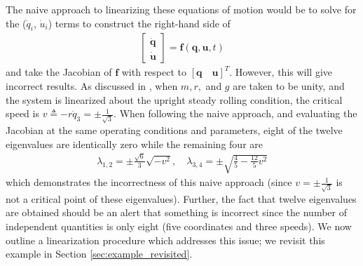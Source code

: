 \documentclass[smallcondensed,final]{svjour3}                     %
\begin{document}
The naive approach to linearizing these equations of motion would be to solve
for the ($\dot{q}_i$, $\dot{u}_i$) terms to construct the right-hand side of
\begin{align}
\begin{bmatrix}\dot{\mathbf{q}} \\ \dot{\mathbf{u}}\end{bmatrix} =
    \mathbf{f}(\mathbf{q}, \mathbf{u}, t)
\end{align}
and take the Jacobian of $\mathbf{f}$ with respect to $[\mathbf{q} \quad
\mathbf{u}]^T$. However, this will give incorrect results. As discussed in
\cite{Schwab2003}, when $m, r,$ and $g$ are taken to be unity, and the system
is linearized about the upright steady rolling condition, the critical speed is
$v \triangleq -r\dot{q}_3 =\pm\frac{1}{\sqrt{3}}$. When following the naive approach, and
evaluating the Jacobian at the same operating conditions and parameters, eight
of the twelve eigenvalues are identically zero while the remaining four are
\begin{align}
  \label{eq:evals_incorrect}
  \lambda_{1,2}=\pm\frac{\sqrt{6}}{3}\sqrt{-v^2},
  \quad \lambda_{3,4} = \pm\sqrt{\frac{4}{5} - \frac{12}{5} v^2}
\end{align}
which demonstrates the incorrectness of this naive approach (since
$v=\pm\frac{1}{\sqrt{3}}$ is not a critical point of these eigenvalues).
Further, the fact that twelve eigenvalues are obtained should be an alert that
something is incorrect since the number of independent quantities is only eight
(five coordinates and three speeds). We now outline a linearization procedure
which addresses this issue; we revisit this example in Section
\ref{sec:example_revisited}.
\end{document}
